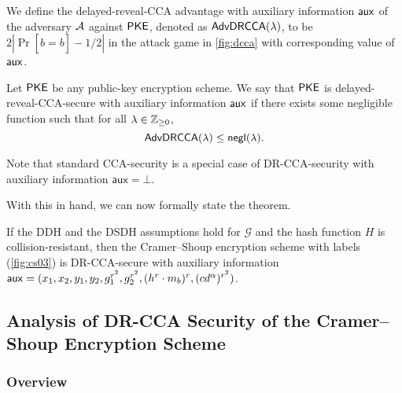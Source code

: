 We define the delayed-reveal-CCA advantage with auxiliary information $\mathsf{aux}$ of the adversary $\mathcal{A}$ against $\mathsf{PKE}$, denoted as $\mathsf{AdvDRCCA}(\lambda)$, to be $2|\Pr[\hat{b} = b] - 1/2|$ in the attack game in \cref{fig:dcca} with corresponding value of $\mathsf{aux}$. %

\begin{definition}
	Let $\mathsf{PKE}$ be any public-key encryption scheme. We say that $\mathsf{PKE}$ is delayed-reveal-CCA-secure with auxiliary information $\mathsf{aux}$ if there exists some negligible function such that for all $\lambda\in\mathbb{Z}_{\geq 0}$, $$\mathsf{AdvDRCCA}(\lambda)\leq\mathsf{negl}(\lambda).$$
\end{definition}
Note that standard CCA-security is a special case of DR-CCA-security with auxiliary information $\mathsf{aux} = \bot$.

With this in hand, we can now formally state the theorem.

\begin{theorem}
	\label{thm:drcca-cs}
	If the DDH and the DSDH assumptions hold for $\mathcal{G}$ and the hash function $H$ is collision-resistant, then the Cramer--Shoup encryption scheme with labels (\cref{fig:cs03}) is DR-CCA-secure with auxiliary information $\mathsf{aux} = (x_1,x_2,y_1,y_2,g_1^{r^2},g_2^{r^2},(h^r\cdot m_b)^{r},(cd^{\alpha})^{r^2})$.
\end{theorem}

\subsection{Analysis of DR-CCA Security of the Cramer--Shoup Encryption Scheme}

\subsubsection{Overview}

